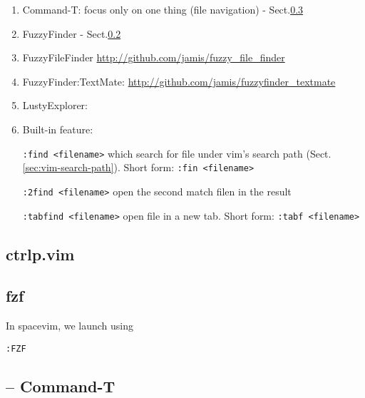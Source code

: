 \begin{enumerate}
  \item Command-T: focus only on one thing (file navigation) -
  Sect.\ref{sec:Command-T}


  \item FuzzyFinder - Sect.\ref{sec:fzf}
  
  \item FuzzyFileFinder
  \url{http://github.com/jamis/fuzzy_file_finder}
  
  \item FuzzyFinder:TextMate: 
  \url{http://github.com/jamis/fuzzyfinder_textmate} 
  
  \item LustyExplorer: 
  
  \item Built-in feature:
  
  \verb!:find <filename>! which search for file under vim's search path
  (Sect.\ref{sec:vim-search-path}). Short form: \verb!:fin <filename>!
  
  \verb!:2find <filename>! open the second match filen in the result
  
  \verb!:tabfind <filename>! open file in a new tab.
  Short form:  \verb!:tabf <filename>!
  
\end{enumerate}

\subsection{ctrlp.vim}
\label{sec:ctrlp.vim}

\subsection{fzf}
\label{sec:fzf}


In spacevim, we launch using
\begin{verbatim}
:FZF
\end{verbatim}

\subsection{-- Command-T}
\label{sec:Command-T}


